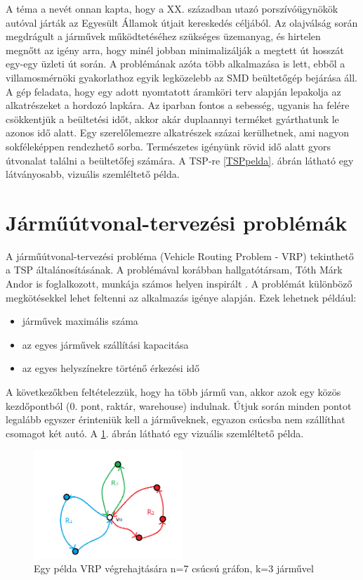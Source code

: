 A téma a nevét onnan kapta, hogy a XX. században utazó porszívóügynökök autóval járták az Egyesült Államok útjait kereskedés céljából. Az olajválság során megdrágult a járművek működtetéséhez szükséges üzemanyag, és hirtelen megnőtt az igény arra, hogy minél jobban minimalizálják a megtett út hosszát egy-egy üzleti út során. A problémának azóta több alkalmazása is lett, ebből a villamosmérnöki gyakorlathoz egyik legközelebb az SMD beültetőgép bejárása áll. A gép feladata, hogy egy adott nyomtatott áramköri terv alapján lepakolja az alkatrészeket a hordozó lapkára. Az iparban fontos a sebesség, ugyanis ha felére csökkentjük a beültetési időt, akkor akár duplaannyi terméket gyárthatunk le azonos idő alatt. Egy szerelőlemezre alkatrészek százai kerülhetnek, ami nagyon sokféleképpen rendezhető sorba. Természetes igényünk  rövid idő alatt gyors útvonalat találni a beültetőfej számára. A TSP-re \ref{TSPpelda}. ábrán látható egy látványosabb, vizuális szemléltető példa.

\section{Járműútvonal-tervezési problémák \label{VRPsection}}
A járműútvonal-tervezési probléma (Vehicle Routing Problem - VRP) tekinthető a TSP általánosításának. A problémával korábban hallgatótársam, Tóth Márk Andor is foglalkozott, munkája számos helyen inspirált \cite{alg_optim}. A problémát különböző megkötésekkel lehet feltenni az alkalmazás igénye alapján. Ezek lehetnek például:
\begin{itemize}
	\item járművek maximális száma
	\item az egyes járművek szállítási kapacitása
	\item az egyes helyszínekre történő érkezési idő
\end{itemize}

A következőkben feltételezzük, hogy ha több jármű van, akkor azok egy közös kezdőpontból (0. pont, raktár, warehouse) indulnak. Útjuk során minden pontot legalább egyszer érinteniük kell a járműveknek, egyazon csúcsba nem szállíthat csomagot két autó. A \ref{VRPpelda}. ábrán látható egy vizuális szemléltető példa.

\begin{figure}[ht!]
	\centering
	\includegraphics[width=0.5\textwidth]{figures/VRP_Szoveg_nelkul.png}
	\caption{Egy példa VRP végrehajtására n=7 csúcsú gráfon, k=3 járművel \label{VRPpelda} }
\end{figure}


